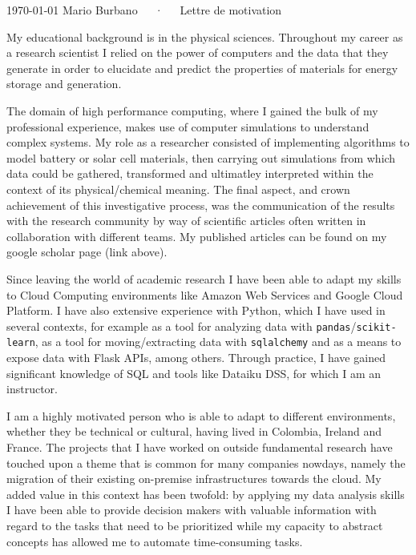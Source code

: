 \documentclass[11pt, a4paper]{awesome-cv}
\begin{document}
\makecvheader[R]

\makecvfooter
  {\today}
  {Mario Burbano~~~·~~~Lettre de motivation}
  {}

\makelettertitle

\begin{cvletter}


My educational background is in the physical sciences. Throughout my career as a research scientist I relied on the power of computers and the data that they generate in order to elucidate and predict the properties of materials for energy storage and generation.

The domain of high performance computing, where I gained the bulk of my professional experience, makes use of computer simulations to understand complex systems. My role as a researcher consisted of implementing algorithms to model battery or solar cell materials, then carrying out simulations from which data could be gathered, transformed and ultimatley interpreted within the context of its physical/chemical meaning. The final aspect, and crown achievement of this investigative process, was the communication of the results with the research community by way of scientific articles often written in collaboration with different teams. My published articles can be found on my google scholar page (link above).

Since leaving the world of academic research I have been able to adapt my skills to Cloud Computing environments like Amazon Web Services and Google Cloud Platform. I have also extensive experience with Python, which I have used in several contexts, for example as a tool for analyzing data with \texttt{pandas}/\texttt{scikit-learn}, as a tool for moving/extracting data with \texttt{sqlalchemy} and as a means to expose data with Flask APIs, among others. Through practice, I have gained significant knowledge of SQL and tools like Dataiku DSS, for which I am an instructor.

I am a highly motivated person who is able to adapt to different environments, whether they be technical or cultural, having lived in Colombia, Ireland and France. The projects that I have worked on outside fundamental research have touched upon a theme that is common for many companies nowdays, namely the migration of their existing on-premise infrastructures towards the cloud. My added value in this context has been twofold: by applying my data analysis skills I have been able to provide decision makers with valuable information with regard to the tasks that need to be prioritized while my capacity to abstract concepts has allowed me to automate time-consuming tasks.


\end{cvletter}
\end{document}
